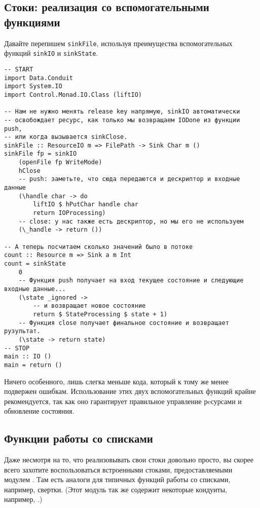 \subsection{Стоки: реализация со вспомогательными функциями}
Давайте перепишем \lstinline'sinkFile', используя преимущества вспомогательных функций 
\lstinline'sinkIO' и \lstinline'sinkState'.
\begin{lstlisting}
-- START
import Data.Conduit
import System.IO
import Control.Monad.IO.Class (liftIO)

-- Нам не нужно менять release key напрямую, sinkIO автоматически
-- освобождает ресурс, как только мы возвращаем IODone из функции push,
-- или когда вызывается sinkClose.
sinkFile :: ResourceIO m => FilePath -> Sink Char m ()
sinkFile fp = sinkIO
    (openFile fp WriteMode)
    hClose
    -- push: заметьте, что сюда передаются и дескриптор и входные данные
    (\handle char -> do
        liftIO $ hPutChar handle char
        return IOProcessing)
    -- close: у нас также есть дескриптор, но мы его не используем
    (\_handle -> return ())

-- А теперь посчитаем сколько значений было в потоке
count :: Resource m => Sink a m Int
count = sinkState
    0
    -- Функция push получает на вход текущее состояние и следующие входные данные...
    (\state _ignored ->
        -- и возвращает новое состояние
        return $ StateProcessing $ state + 1)
    -- Функция close получает финальное состояние и возвращает рузультат.
    (\state -> return state)
-- STOP
main :: IO ()
main = return ()
\end{lstlisting}
Ничего особенного, лишь слегка меньше кода, который к тому же менее подвержен ошибкам. Использование этих двух
вспомогательных  функций крайне рекомендуется, так как оно гарантирует правильное
управление рeсурсами и обновление состояния.

\subsection{Функции работы со списками}
Даже несмотря на то, что реализовывать свои стоки довольно просто, вы скорее всего захотите воспользоваться встроенными стоками, предоставляемыми модулем
. Там есть аналоги для типичных функций работы со
списками, например, свертки. (Этот модуль так же содержит некоторые кондуиты,
например, 
.)

